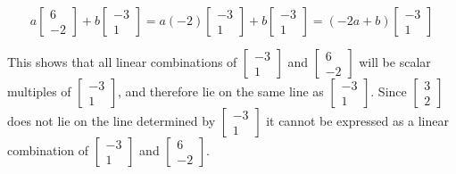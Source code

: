 \documentclass{ximera}
\begin{document}
\begin{example}
\begin{explanation}
$$a\begin{bmatrix}6\\-2\end{bmatrix}+b\begin{bmatrix}-3\\1\end{bmatrix}=a(-2)\begin{bmatrix}-3\\1\end{bmatrix}+b\begin{bmatrix}-3\\1\end{bmatrix}=(-2a+b)\begin{bmatrix}-3\\1\end{bmatrix}$$

This shows that all linear combinations of $\begin{bmatrix}-3\\1\end{bmatrix}$ and $\begin{bmatrix}6\\-2\end{bmatrix}$ will be scalar multiples of $\begin{bmatrix}-3\\1\end{bmatrix}$, and therefore lie on the same line as $\begin{bmatrix}-3\\1\end{bmatrix}$.
Since $\begin{bmatrix}3\\2\end{bmatrix}$ does not lie on the line determined by $\begin{bmatrix}-3\\1\end{bmatrix}$ it cannot be expressed as a linear combination of $\begin{bmatrix}-3\\1\end{bmatrix}$ and $\begin{bmatrix}6\\-2\end{bmatrix}$.


\end{explanation}
\end{example}
\end{document}
